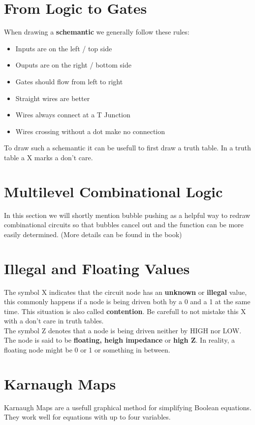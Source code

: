 \section{From Logic to Gates}
When drawing a \textbf{schemantic} we generally follow these rules:
\begin{itemize}
    \item Inputs are on the left / top side
    \item Ouputs are on the right / bottom side
    \item Gates should flow from left to right
    \item Straight wires are better
    \item Wires always connect at a T Junction
    \item Wires crossing without a dot make no connection
\end{itemize}
To draw such a schemantic it can be usefull to first draw a truth table. In a truth table a X marks a don't care.

\section{Multilevel Combinational Logic}
In this section we will shortly mention bubble pushing as a helpful way to redraw combinational circuits so that bubbles cancel
out and the function can be more easily determined. (More details can be found in the book)

\section{Illegal and Floating Values}
The symbol X indicates that the circuit node has an \textbf{unknown} or \textbf{illegal} value, this commonly happens if a node
is being driven both by a 0 and a 1 at the same time. This situation is also called \textbf{contention}. Be carefull to not mistake this
X with a don't care in truth tables. \\

The symbol Z denotes that a node is being driven neither by HIGH nor LOW. The node is said to be \textbf{floating, heigh impedance} or \textbf{high Z}.
In reality, a floating node might be 0 or 1 or something in between.

\section{Karnaugh Maps}
Karnaugh Maps are a usefull graphical method for simplifying Boolean equations. They work well for equations with up to four
variables. 

